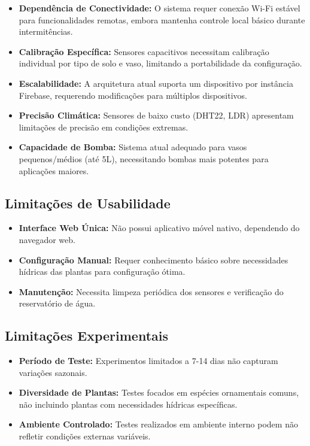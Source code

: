 \documentclass[twoside,english,brazilian]{UNISINOSmonografia}
\begin{document}
\begin{itemize}
    \item \textbf{Dependência de Conectividade:} O sistema requer conexão Wi-Fi estável para funcionalidades remotas, embora mantenha controle local básico durante intermitências.
    \item \textbf{Calibração Específica:} Sensores capacitivos necessitam calibração individual por tipo de solo e vaso, limitando a portabilidade da configuração.
    \item \textbf{Escalabilidade:} A arquitetura atual suporta um dispositivo por instância Firebase, requerendo modificações para múltiplos dispositivos.
    \item \textbf{Precisão Climática:} Sensores de baixo custo (DHT22, LDR) apresentam limitações de precisão em condições extremas.
    \item \textbf{Capacidade de Bomba:} Sistema atual adequado para vasos pequenos/médios (até 5L), necessitando bombas mais potentes para aplicações maiores.
\end{itemize}

\subsection{Limitações de Usabilidade}
\begin{itemize}
    \item \textbf{Interface Web Única:} Não possui aplicativo móvel nativo, dependendo do navegador web.
    \item \textbf{Configuração Manual:} Requer conhecimento básico sobre necessidades hídricas das plantas para configuração ótima.
    \item \textbf{Manutenção:} Necessita limpeza periódica dos sensores e verificação do reservatório de água.
\end{itemize}

\subsection{Limitações Experimentais}
\begin{itemize}
    \item \textbf{Período de Teste:} Experimentos limitados a 7-14 dias não capturam variações sazonais.
    \item \textbf{Diversidade de Plantas:} Testes focados em espécies ornamentais comuns, não incluindo plantas com necessidades hídricas específicas.
    \item \textbf{Ambiente Controlado:} Testes realizados em ambiente interno podem não refletir condições externas variáveis.
\end{itemize}
\end{document}
